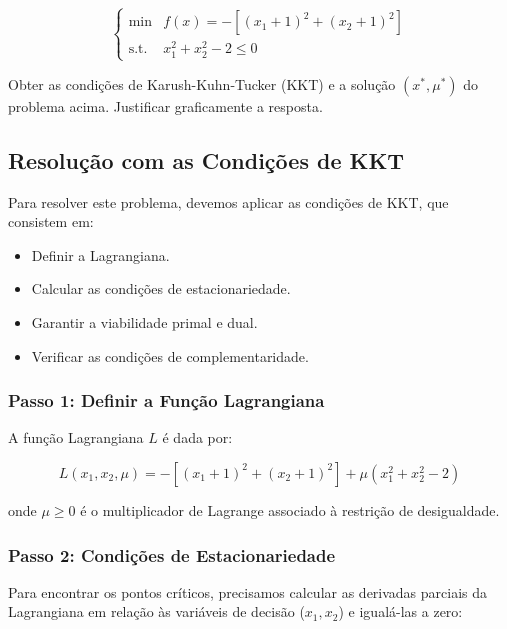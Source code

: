 \documentclass[a4paper, 12pt]{article}
\begin{document}
\begin{equation*}
    \begin{cases}
        \text{min} & f(x) = -\left[ (x_1 + 1)^2 + (x_2 + 1)^2 \right] \\
        \text{s.t.} & x_1^2 + x_2^2 - 2 \leq 0
    \end{cases}
\end{equation*}

Obter as condi\c{c}\~oes de Karush-Kuhn-Tucker (KKT) e a solu\c{c}\~ao $(x^*, \mu^*)$ do problema acima. Justificar graficamente a resposta.

\subsection{Resolu\c{c}\~ao com as Condições de KKT}

Para resolver este problema, devemos aplicar as condi\c{c}\~oes de KKT, que consistem em:

\begin{itemize}
    \item Definir a Lagrangiana.
    \item Calcular as condi\c{c}\~oes de estacionariedade.
    \item Garantir a viabilidade primal e dual.
    \item Verificar as condi\c{c}\~oes de complementaridade.
\end{itemize}

\subsubsection{Passo 1: Definir a Fun\c{c}\~ao Lagrangiana}
A fun\c{c}\~ao Lagrangiana \(L\) \'e dada por:

\begin{equation*}
    L(x_1, x_2, \mu) = -\left[ (x_1 + 1)^2 + (x_2 + 1)^2 \right] + \mu (x_1^2 + x_2^2 - 2)
\end{equation*}

onde \(\mu \geq 0\) \'e o multiplicador de Lagrange associado \`a restri\c{c}\~ao de desigualdade.

\subsubsection{Passo 2: Condi\c{c}\~oes de Estacionariedade}
Para encontrar os pontos cr\'iticos, precisamos calcular as derivadas parciais da Lagrangiana em rela\c{c}\~ao \`as vari\'aveis de decis\~ao ($x_1, x_2$) e igual\'a-las a zero:
\end{document}
